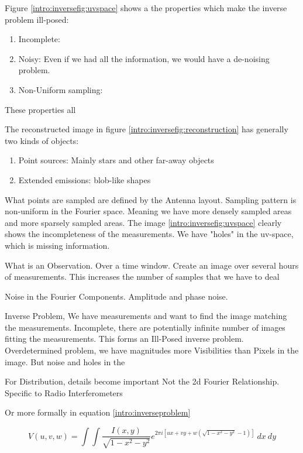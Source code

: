 Figure \ref{intro:inversefig:uvspace} shows a the properties which make the inverse problem ill-posed:
\begin{enumerate}
	\item Incomplete: 
	\item Noisy: Even if we had all the information, we would have a de-noising problem.
	\item Non-Uniform sampling:
\end{enumerate}

These properties all

The reconstructed image in figure \ref{intro:inversefig:reconstruction} has generally two kinds of objects:
\begin{enumerate}
	\item Point sources: Mainly stars and other far-away objects
	\item Extended emissions: blob-like shapes
\end{enumerate}


What points are sampled are defined by the Antenna layout. Sampling pattern is non-uniform in the Fourier space. Meaning we have more densely sampled areas and more sparsely sampled areas. The image \ref{intro:inversefig:uvspace} clearly shows the incompleteness of the measurements. We have "holes" in the uv-space, which is missing information.

What is an Observation. Over a time window. Create an image over several hours of measurements. This increases the number of samples that we have to deal

Noise in the Fourier Components. Amplitude and phase noise. 

Inverse Problem, We have measurements and want to find the image matching the measurements. Incomplete, there are potentially infinite number of images fitting 
the measurements. This forms an Ill-Posed inverse problem. 
Overdetermined problem, we have magnitudes more Visibilities than Pixels in the image. But noise and holes in the 

For Distribution, details become important
Not the 2d Fourier Relationship.
Specific to Radio Interferometers


Or more formally in equation \eqref{intro:inverseproblem}


\begin{equation}\label{intro:inverseproblem}
V(u, v, w) = \int\int \frac{I(x, y)}{\sqrt{1 - x^2 - y ^2}} e^{2 \pi i [ux+vy+ w(\sqrt{1 - x^2 - y ^2} - 1)]} \: dx \: dy
\end{equation}

